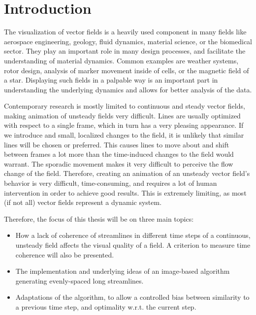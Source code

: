 
\chapter{Introduction}

The visualization of vector fields is a heavily used component in many fields like aerospace engineering, geology, fluid dynamics, material science, or the biomedical sector.
They play an important role in many design processes, and facilitate the understanding of material dynamics.
Common examples are weather systems, rotor design, analysis of marker movement inside of cells, or the magnetic field of a star.
Displaying such fields in a palpable way is an important part in understanding the underlying dynamics and allows for better analysis of the data.

Contemporary research is mostly limited to continuous and steady vector fields, making animation of unsteady fields very difficult.
Lines are usually optimized with respect to a single frame, which in turn has a very pleasing appearance.
If we introduce and small, localized changes to the field, it is unlikely that similar lines will be chosen or preferred.
This causes lines to move about and shift between frames a lot more than the time-induced changes to the field would warrant.
The sporadic movement makes it very difficult to perceive the flow change of the field.
Therefore, creating an animation of an unsteady vector field's behavior is very difficult,
time-consuming, and requires a lot of human intervention in order to achieve good results.
This is extremely limiting, as most (if not all) vector fields represent a dynamic system.

Therefore, the focus of this thesis will be on three main topics:
\begin{itemize}
    \item How a lack of coherence of streamlines in different time steps of a continuous, unsteady field affects the visual quality of a field.
    A criterion to measure time coherence will also be presented.
    \item The implementation and underlying ideas of an image-based algorithm generating evenly-spaced long streamlines.
    \item Adaptations of the algorithm, to allow a controlled bias between similarity to a previous time step, and optimality w.r.t. the current step.
\end{itemize}

